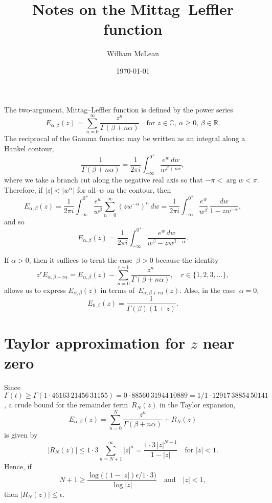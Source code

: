 \documentclass[12pt,a4paper]{article}
\title{Notes on the Mittag--Leffler function}
\author{William McLean}
\date{\today}
\begin{document}
\maketitle
The two-argument, Mittag--Leffler function is defined by the power series
\begin{equation}\label{eq: E alpha beta def}
E_{\alpha,\beta}(z)=\sum_{n=0}^\infty\frac{z^n}{\Gamma(\beta+n\alpha)}
\quad\text{for $z\in\mathbb{C}$, $\alpha\ge0$, $\beta\in\mathbb{R}$.}
\end{equation}
The reciprocal of the Gamma function may be written as an integral along a
Hankel contour,
\[
\frac{1}{\Gamma(\beta+n\alpha)}=\frac{1}{2\pi i}\int_{-\infty}^{0^+}
    \frac{e^w\,dw}{w^{\beta+n\alpha}},
\]
where we take a branch cut along the negative real axis so that 
$-\pi<\arg w<\pi$. Therefore, if $|z|<|w^\alpha|$ for all~$w$ on the contour, 
then
\[
E_{\alpha,\beta}(z)=\frac{1}{2\pi i}\int_{-\infty}^{0^+}\frac{e^w}{w^\beta}
    \sum_{n=0}^\infty(zw^{-\alpha})^n\,dw
    =\frac{1}{2\pi i}\int_{-\infty}^{0^+}\frac{e^w}{w^\beta}\,
    \frac{dw}{1-zw^{-\alpha}},
\]
and so
\begin{equation}\label{eq: integral repn}
E_{\alpha,\beta}(z)=\frac{1}{2\pi i}\int_{-\infty}^{0^+}
    \frac{e^w\,dw}{w^\beta-zw^{\beta-\alpha}}.
\end{equation}

If $\alpha>0$, then it suffices to treat the case~$\beta>0$ because the identity
\begin{equation}\label{eq: beta identity}
z^rE_{\alpha,\beta+r\alpha}=E_{\alpha,\beta}(z)
    -\sum_{n=0}^{r-1}\frac{z^n}{\Gamma(\beta+n\alpha)},\quad 
r\in\{1,2,3,\ldots\},
\end{equation}
allows us to express $E_{\alpha,\beta}(z)$ in terms 
of~$E_{\alpha,\beta+r\alpha}(z)$.  Also, in the case~$\alpha=0$,
\[
E_{0,\beta}(z)=\frac{1}{\Gamma(\beta)(1+z)}.
\]
\section{Taylor approximation for $z$ near zero}
Since 
$\Gamma(t)\ge\Gamma(1{\cdot}46163\,21456\,31155)=0{\cdot}88560\,31944\,10889
=1/1{\cdot}12917\,38854\,50141$, a crude bound for the remainder term~$R_N(z)$ 
in the Taylor expansion,
\[
E_{\alpha,\beta}(z)=\sum_{n=0}^N\frac{z^n}{\Gamma(\beta+n\alpha)}+R_N(z)
\]
is given by
\[
|R_N(z)|\le1{\cdot}3\sum_{n=N+1}^\infty|z|^n=\frac{1{\cdot}3\,|z|^{N+1}}{1-|z|}
\quad\text{for $|z|<1$.}
\]
Hence, if
\[
N+1\ge\frac{\log\bigl((1-|z|)\epsilon/1{\cdot}3\bigr)}{\log|z|}
\quad\text{and}\quad|z|<1,
\]
then $|R_N(z)|\le\epsilon$.
\end{document}
